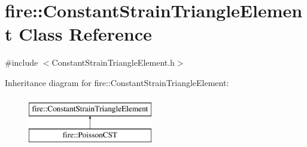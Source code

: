 \hypertarget{a00773}{}\section{fire\+:\+:Constant\+Strain\+Triangle\+Element Class Reference}
\label{a00773}


{\ttfamily \#include $<$Constant\+Strain\+Triangle\+Element.\+h$>$}

Inheritance diagram for fire\+:\+:Constant\+Strain\+Triangle\+Element\+:\begin{figure}[H]
\begin{center}
\leavevmode
\includegraphics[height=2.000000cm]{a00773}
\end{center}
\end{figure}

